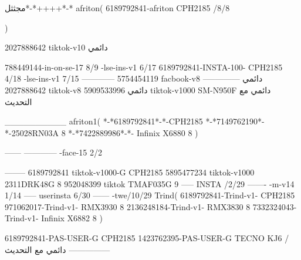 مجثثل*-*++++*-*
afriton(
6189792841-afriton CPH2185  /8/8

)

2027888642 tiktok-v10
دائمي

788449144-in-on-se-17 8/9
-lse-ins-v1 6/17
6189792841-INSTA-100- CPH2185 4/18
-lse-ins-v1 7/15
------------
5754454119 facbook-v8
دائمي
--------------
2027888642 tiktok-v8
دائمي
5909533996 tiktok-v1000  SM-N950F
دائمي مع التحديث

__________
afriton1(
*-*6189792841*-*-CPH2185
*-*7149762190*-*-25028RN03A  8
*-*7422889986*-*- Infinix X6880  8
)


------
------------
-face-15 2/2

--------
6189792841 tiktok-v1000-G CPH2185 
5895477234 tiktok-v1000 2311DRK48G 8
952048399 tiktok TMAF035G 9
-----
 INSTA /2/29
-------
-m-v14 1/14
-----
userinsta 6/30
------
-twe/10/29
Trind(
6189792841-Trind-v1- CPH2185 
971062017-Trind-v1- RMX3930 8
2136248184-Trind-v1- RMX3830 8
7332324043-Trind-v1- Infinix X6882 8
)


6189792841-PAS-USER-G CPH2185 
1423762395-PAS-USER-G TECNO KJ6  /دائمي مع التحديث
    ---------------
